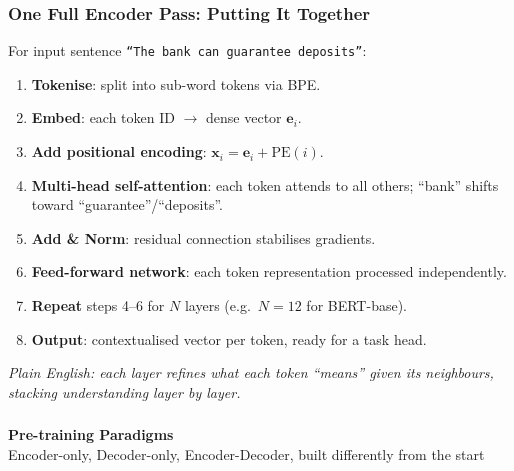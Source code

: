 \begin{frame}[fragile]\frametitle{One Full Encoder Pass: Putting It Together}
For input sentence \texttt{``The bank can guarantee deposits''}:
\begin{enumerate}
  \item \textbf{Tokenise}: split into sub-word tokens via BPE.
  \item \textbf{Embed}: each token ID $\rightarrow$ dense vector $\mathbf{e}_i$.
  \item \textbf{Add positional encoding}: $\mathbf{x}_i = \mathbf{e}_i + \text{PE}(i)$.
  \item \textbf{Multi-head self-attention}: each token attends to all others;
    ``bank'' shifts toward ``guarantee''/``deposits''.
  \item \textbf{Add \& Norm}: residual connection stabilises gradients.
  \item \textbf{Feed-forward network}: each token representation processed
    independently.
  \item \textbf{Repeat} steps 4--6 for $N$ layers (e.g.\ $N=12$ for
    BERT-base).
  \item \textbf{Output}: contextualised vector per token, ready for a
    task head.
\end{enumerate}
\textit{Plain English: each layer refines what each token ``means'' given
its neighbours, stacking understanding layer by layer.}
\end{frame}



\begin{frame}[fragile]\frametitle{}
\begin{center}
{\Large \textbf{Pre-training Paradigms}}\\[0.5em]
{\normalsize Encoder-only, Decoder-only, Encoder-Decoder, built differently from the start}
\end{center}
\end{frame}

